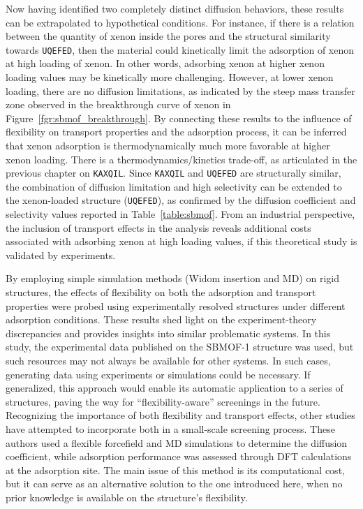 \documentclass[main]{subfiles}
\begin{document}
Now having identified two completely distinct diffusion behaviors, these results can be extrapolated to hypothetical conditions. For instance, if there is a relation between the quantity of xenon inside the pores and the structural similarity towards \texttt{UQEFED}, then the material could kinetically limit the adsorption of xenon at high loading of xenon. In other words, adsorbing xenon at higher xenon loading values may be kinetically more challenging. However, at lower xenon loading, there are no diffusion limitations, as indicated by the steep mass transfer zone observed in the breakthrough curve of xenon in Figure~\ref{fgr:sbmof_breakthrough}. By connecting these results to the influence of flexibility on transport properties and the adsorption process, it can be inferred that xenon adsorption is thermodynamically much more favorable at higher xenon loading. There is a thermodynamics/kinetics trade-off, as articulated in the previous chapter on \texttt{KAXQIL}. Since \texttt{KAXQIL} and \texttt{UQEFED} are structurally similar, the combination of diffusion limitation and high selectivity can be extended to the xenon-loaded structure (\texttt{UQEFED}), as confirmed by the diffusion coefficient and selectivity values reported in Table~\ref{table:sbmof}. From an industrial perspective, the inclusion of transport effects in the analysis reveals additional costs associated with adsorbing xenon at high loading values, if this theoretical study is validated by experiments.

By employing simple simulation methods (Widom insertion and MD) on rigid structures, the effects of flexibility on both the adsorption and transport properties were probed using experimentally resolved structures under different adsorption conditions. These results shed light on the experiment-theory discrepancies and provides insights into similar problematic systems. In this study, the experimental data published on the SBMOF-1 structure was used, but such resources may not always be available for other systems. In such cases, generating data using experiments or simulations could be necessary. If generalized, this approach would enable its automatic application to a series of structures, paving the way for ``flexibility-aware'' screenings in the future. Recognizing the importance of both flexibility and transport effects, other studies have attempted to incorporate both in a small-scale screening process.\autocite{Stanton_2022} These authors used a flexible forcefield and MD simulations to determine the diffusion coefficient, while adsorption performance was assessed through DFT calculations at the adsorption site. The main issue of this method is its computational cost, but it can serve as an alternative solution to the one introduced here, when no prior knowledge is available on the structure’s flexibility. 
\end{document}
